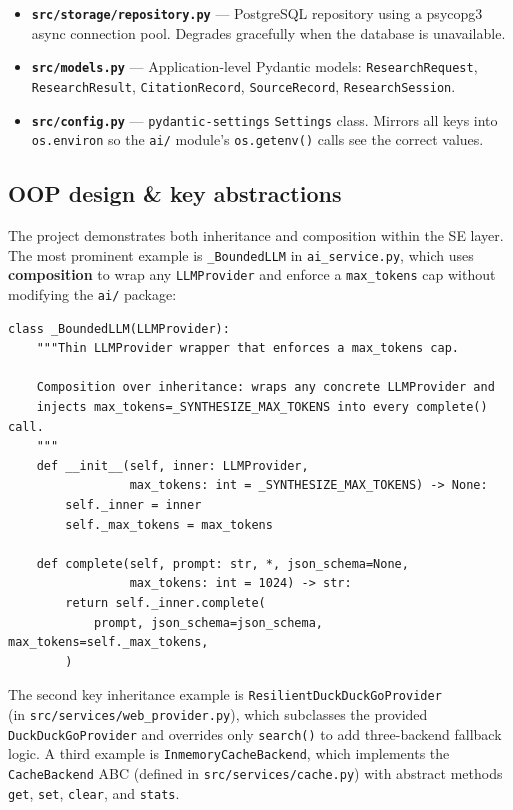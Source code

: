 \documentclass[11pt,a4paper]{article}
\begin{document}
\begin{itemize}[itemsep=3pt]
  \item \textbf{\texttt{src/storage/repository.py}} --- PostgreSQL repository using a
    psycopg3 async connection pool. Degrades gracefully when the database is
    unavailable.

  \item \textbf{\texttt{src/models.py}} --- Application-level Pydantic models:
    \texttt{ResearchRequest}, \texttt{ResearchResult}, \texttt{CitationRecord},
    \texttt{SourceRecord}, \texttt{ResearchSession}.

  \item \textbf{\texttt{src/config.py}} --- \texttt{pydantic-settings} \texttt{Settings}
    class. Mirrors all keys into \texttt{os.environ} so the \texttt{ai/} module's
    \texttt{os.getenv()} calls see the correct values.
\end{itemize}

\subsection{OOP design \& key abstractions}

The project demonstrates both inheritance and composition within the SE layer. The most
prominent example is \texttt{\_BoundedLLM} in \texttt{ai\_service.py}, which uses
\textbf{composition} to wrap any \texttt{LLMProvider} and enforce a
\texttt{max\_tokens} cap without modifying the \texttt{ai/} package:

\begin{lstlisting}[style=python,
  caption={Composition: \texttt{\_BoundedLLM} wraps any \texttt{LLMProvider}}]
class _BoundedLLM(LLMProvider):
    """Thin LLMProvider wrapper that enforces a max_tokens cap.

    Composition over inheritance: wraps any concrete LLMProvider and
    injects max_tokens=_SYNTHESIZE_MAX_TOKENS into every complete() call.
    """
    def __init__(self, inner: LLMProvider,
                 max_tokens: int = _SYNTHESIZE_MAX_TOKENS) -> None:
        self._inner = inner
        self._max_tokens = max_tokens

    def complete(self, prompt: str, *, json_schema=None,
                 max_tokens: int = 1024) -> str:
        return self._inner.complete(
            prompt, json_schema=json_schema, max_tokens=self._max_tokens,
        )
\end{lstlisting}

The second key inheritance example is
\texttt{Resilient\-Duck\-Duck\-Go\-Provider}\\
(in \texttt{src/ser\-vices/web\_pro\-vider.py}),
which subclasses the provided \texttt{DuckDuckGoProvider} and overrides only
\texttt{search()} to add three-backend fallback logic. A third example is
\texttt{Inme\-mory\-Cache\-Backend}, which implements the \texttt{CacheBackend} ABC
(defined in \texttt{src/services/cache.py}) with abstract methods
\texttt{get}, \texttt{set}, \texttt{clear}, and \texttt{stats}.
\end{document}
